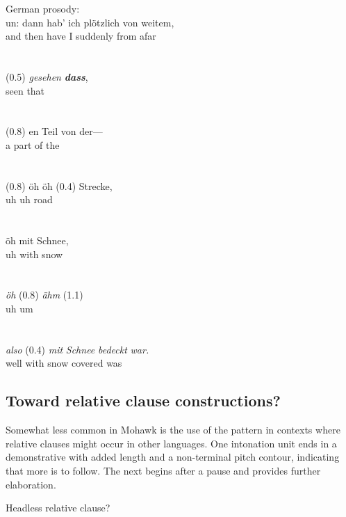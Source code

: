 \documentclass[output=paper]{langscibook}
\begin{document}
\ea%
    \label{ex:mithun:24}
    German prosody:  \citealt[937]{Himmelmann2014}\\
\gll     un:    dann  hab’  ich  plötzlich    von    weitem,\\
      and    then    have  I    suddenly  from  afar\\~\\~\\
  \gll  (0.5)  \textit{gesehen} \textbf{\textit{dass}},\\
     {}     seen    that\\~\\~\\
\gll    (0.8)  en  Teil    von  der—\\
        {}  a    part    of    the\\~\\~\\
\gll    (0.8)  öh  öh (0.4)  Strecke,\\
         {} uh  uh     {}   road\\~\\~\\
\gll    öh  mit    Schnee,\\
    uh  with    snow\\~\\~\\

\gll \textit{öh}  (0.8)  \textit{ähm}  (1.1)\\
    uh     {}    um  {} \\~\\~\\

\gll \textit{also}  (0.4)  \textit{mit}    \textit{Schnee} \textit{bedeckt} \textit{war.}\\
    well     {}   with    snow    covered    was\\
\z

\subsection{Toward relative clause constructions?} %
\label{sec:mithun:7.2}

Somewhat less common in Mohawk is the use of the pattern in contexts where relative clauses might occur in other languages. One intonation unit ends in a demonstrative with added length and a non-terminal pitch contour, indicating that more is to follow. The next begins after a pause and provides further elaboration.

\ea%
    \label{ex:mithun:25}
    Headless relative clause?\\
    
\end{document}
